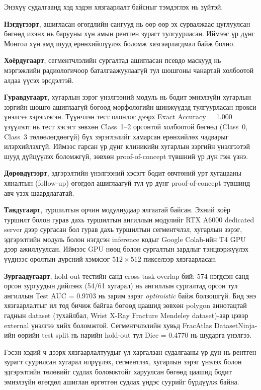 Энэхүү судалгаанд хэд хэдэн хязгаарлалт байсныг тэмдэглэх нь зүйтэй.

\textbf{Нэгдүгээрт}, ашигласан өгөгдлийн сангууд нь өөр өөр эх сурвалжаас цуглуулсан бөгөөд ихэнх нь барууны хүн амын рентген зурагт тулгуурласан. Иймээс үр дүнг Монгол хүн амд шууд ерөнхийшүүлэх боломж хязгаарлагдмал байж болно.

\textbf{Хоёрдугаарт}, сегментчлэлийн сургалтад ашигласан псевдо маскууд нь мэргэжлийн радиологичоор баталгаажуулаагүй тул шошгоны чанартай холбоотой алдаа үүсэх эрсдэлтэй.

\textbf{Гуравдугаарт}, хугарлын зэрэг үнэлгээний модуль нь бодит эмнэлзүйн хугарлын зэргийн шошго ашиглаагүй бөгөөд морфологийн шинжүүдэд тулгуурласан прокси үнэлгээ хэрэглэсэн. Түүнчлэн тест олонлог дээрх Exact Accuracy = 1.000 үзүүлэлт нь тест хэсэгт зөвхөн Class~1--2 орсонтой холбоотой бөгөөд (Class~0, Class~3 төлөөлөгдөөгүй) бүх зэрэглэлийг хамарсан ерөнхийлөх чадварыг илэрхийлэхгүй. Иймээс гарсан үр дүнг клиникийн хугарлын зэргийн үнэлгээтэй шууд дүйцүүлэх боломжгүй, зөвхөн proof-of-concept түвшний үр дүн гэж үзнэ.

\textbf{Дөрөвдүгээрт}, эдгэрэлтийн үнэлгээний хэсэгт бодит өвчтөний урт хугацааны хяналтын (follow-up) өгөгдөл ашиглаагүй тул үр дүнг proof-of-concept түвшинд авч үзэх шаардлагатай.

\textbf{Тавдугаарт}, туршилтын орчин модулиудаар ялгаатай байсан. Эхний хоёр туршилт болон гурав дахь туршилтын ангиллын модулийг RTX A6000 dedicated server дээр сургасан бол гурав дахь туршилтын сегментчлэл, хугарлын зэрэг, эдгэрэлтийн модуль болон нэгдсэн inference кодыг Google Colab-ийн T4 GPU дээр ажиллуулсан. Иймээс GPU нөөц болон сургалтын зардлыг тэнцвэржүүлэх үүднээс оролтын дүрсний хэмжээг $512\times512$ пикселээр хязгаарласан.

\textbf{Зургаадугаарт}, hold-out тестийн санд cross-task overlap бий: 574 нэгдсэн санд орсон зургуудын дийлэнх (54/61 хугарал) нь ангиллын сургалтад орсон тул ангиллын Test AUC = 0.9703 нь зарим зэрэг \emph{optimistic} байж болзошгүй. Бид энэ хязгаарлалтыг ил тод бичиж байгаа бөгөөд цаашид зөвхөн polygon аннотацтай гаднын dataset (тухайлбал, Wrist X-Ray Fracture Mendeley dataset)-аар цэвэр external үнэлгээ хийх боломжтой. Сегментчлэлийн хувьд FracAtlas DatasetNinja-ийн өөрийн test split нь нарийн hold-out тул Dice = 0.4770 нь шударга үнэлгээ.

Гэсэн хэдий ч дээрх хязгаарлалтуудыг үл харгалзан судалгааны үр дүн нь рентген зурагт суурилсан хугарал илрүүлэх, сегментлэх, хугарлын зэрэг үнэлэх болон эдгэрэлтийн төлөвийг судлах боломжтойг харуулсан бөгөөд цаашид бодит эмнэлзүйн өгөгдөл ашиглан өргөтгөн судлах үндэс суурийг бүрдүүлж байна.
